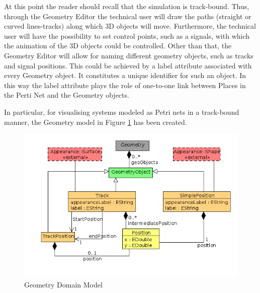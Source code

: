 


At this point the reader should recall that the simulation is track-bound. Thus, through the Geometry Editor the technical user will draw the paths (straight or curved lines-tracks) along which 3D objects will move. Furthermore, the technical user will have the possibility to set control points, such as a signals, with which the animation of the 3D objects could be controlled. Other than that, the Geometry Editor will allow for naming different geometry objects, such as tracks and signal positions. This could be achieved by a label attribute associated with every Geometry object. It constitutes a unique identifier for such an object. In this way the label attribute plays the role of one-to-one link between Places in the Perti Net and the Geometry objects. 

In particular, for visualising systems modeled as Petri nets in a track-bound manner, the Geometry model in Figure \ref{fig:geometry_domain_model} has been created.

\begin{figure}[ht]
   \begin{center}
       \includegraphics[scale=0.50]{image/geometry_domain_model.png}
       \caption{Geometry Domain Model}
       \label{fig:geometry_domain_model}
       \end{center}
   \end{figure}

